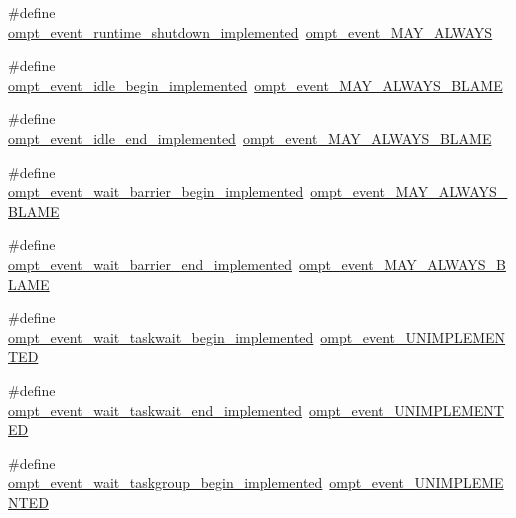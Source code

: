 \begin{DoxyCompactItemize}
\item 
\#define \hyperlink{ompt-event-specific_8h_ac9cfd9935bf59d3ae248ca21038b1add}{ompt\-\_\-event\-\_\-runtime\-\_\-shutdown\-\_\-implemented}~\hyperlink{ompt-event-specific_8h_a4d43508adffb6fe8f9fe8a520b8142f4}{ompt\-\_\-event\-\_\-\-M\-A\-Y\-\_\-\-A\-L\-W\-A\-Y\-S}
\item 
\#define \hyperlink{ompt-event-specific_8h_ad21947e7a4fdf48b5f2fdb59010c962e}{ompt\-\_\-event\-\_\-idle\-\_\-begin\-\_\-implemented}~\hyperlink{ompt-event-specific_8h_a7014420b707fad74a0e4a1f14d46067d}{ompt\-\_\-event\-\_\-\-M\-A\-Y\-\_\-\-A\-L\-W\-A\-Y\-S\-\_\-\-B\-L\-A\-M\-E}
\item 
\#define \hyperlink{ompt-event-specific_8h_a4948de512dd43629af551a60aeb61c6c}{ompt\-\_\-event\-\_\-idle\-\_\-end\-\_\-implemented}~\hyperlink{ompt-event-specific_8h_a7014420b707fad74a0e4a1f14d46067d}{ompt\-\_\-event\-\_\-\-M\-A\-Y\-\_\-\-A\-L\-W\-A\-Y\-S\-\_\-\-B\-L\-A\-M\-E}
\item 
\#define \hyperlink{ompt-event-specific_8h_a9f1d43fd1be45f4e2d24105d3c0c3afc}{ompt\-\_\-event\-\_\-wait\-\_\-barrier\-\_\-begin\-\_\-implemented}~\hyperlink{ompt-event-specific_8h_a7014420b707fad74a0e4a1f14d46067d}{ompt\-\_\-event\-\_\-\-M\-A\-Y\-\_\-\-A\-L\-W\-A\-Y\-S\-\_\-\-B\-L\-A\-M\-E}
\item 
\#define \hyperlink{ompt-event-specific_8h_a4018f88dabb105322c005580f3ed55d2}{ompt\-\_\-event\-\_\-wait\-\_\-barrier\-\_\-end\-\_\-implemented}~\hyperlink{ompt-event-specific_8h_a7014420b707fad74a0e4a1f14d46067d}{ompt\-\_\-event\-\_\-\-M\-A\-Y\-\_\-\-A\-L\-W\-A\-Y\-S\-\_\-\-B\-L\-A\-M\-E}
\item 
\#define \hyperlink{ompt-event-specific_8h_afedae293444d1e6c03bcc5ce66b373a7}{ompt\-\_\-event\-\_\-wait\-\_\-taskwait\-\_\-begin\-\_\-implemented}~\hyperlink{ompt-event-specific_8h_a5719430a79b410eee8d68fcec0fbf8f2}{ompt\-\_\-event\-\_\-\-U\-N\-I\-M\-P\-L\-E\-M\-E\-N\-T\-E\-D}
\item 
\#define \hyperlink{ompt-event-specific_8h_adaf3be4e35013e0e68ab16c30868b01a}{ompt\-\_\-event\-\_\-wait\-\_\-taskwait\-\_\-end\-\_\-implemented}~\hyperlink{ompt-event-specific_8h_a5719430a79b410eee8d68fcec0fbf8f2}{ompt\-\_\-event\-\_\-\-U\-N\-I\-M\-P\-L\-E\-M\-E\-N\-T\-E\-D}
\item 
\#define \hyperlink{ompt-event-specific_8h_a65ac1dd22df8ab75028b34f197ec5416}{ompt\-\_\-event\-\_\-wait\-\_\-taskgroup\-\_\-begin\-\_\-implemented}~\hyperlink{ompt-event-specific_8h_a5719430a79b410eee8d68fcec0fbf8f2}{ompt\-\_\-event\-\_\-\-U\-N\-I\-M\-P\-L\-E\-M\-E\-N\-T\-E\-D}

\end{DoxyCompactItemize}
